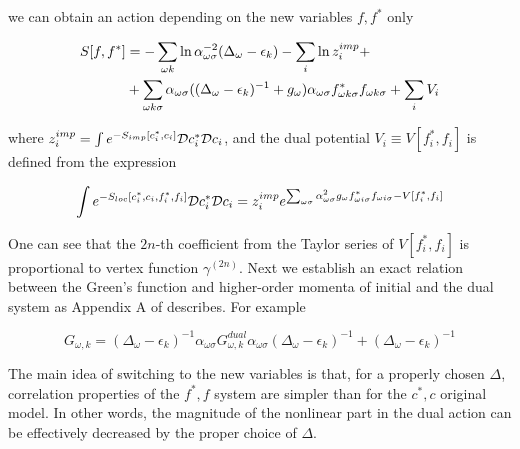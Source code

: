 we can obtain an action depending on the new variables $f,f^*$ only

\begin{equation}\begin{aligned}
S[f,f^*] & = -\sum_{\omega k} \ln{\alpha_{\omega\sigma}^{-2}(\Delta_\omega-\epsilon_k)} - \sum_i\ln{z_i^{imp}} + \\ 
	 & + \sum_{\omega k\sigma} \alpha_{\omega\sigma}((\Delta_\omega-\epsilon_k)^{-1}+g_\omega) \alpha_{\omega\sigma}f_{\omega k\sigma}^*f_{\omega k\sigma}+\sum_i V_i 
\end{aligned}\end{equation}

where $z_i^{imp} = \int e^{-S_{imp}[c_i^*,c_i]}\mathcal{D} c_i^*\mathcal{D} c_i$, and the dual potential $V_i \equiv V[f_i^*,f_i]$ is defined from the expression

\begin{equation} \int e^{-S_{loc}[c_i^*,c_i,f_i^*,f_i]}\mathcal{D} c_i^*\mathcal{D} c_i = 
  z_i^{imp}e^{\sum_{\omega\sigma}\alpha_{\omega\sigma}^2g_\omega f_{\omega i \sigma}^*f_{\omega i \sigma} - V[f_i^*,f_i]} \end{equation}

One can see that the $2n$-th coefficient from the Taylor series of $V[f_i^*,f_i]$ is proportional to vertex function $\gamma^{(2n)}$.
Next we establish an exact relation between the Green's function and higher-order momenta of initial and the dual system as Appendix A of \cite{0810.3819} describes.
For example 

\begin{equation}
 G_{\omega,k} = (\Delta_\omega-\epsilon_k)^{-1}\alpha_{\omega\sigma}G_{\omega,k}^{dual}\alpha_{\omega\sigma}(\Delta_\omega-\epsilon_k)^{-1} + (\Delta_\omega-\epsilon_k)^{-1}
\end{equation}

The main idea of switching to the new variables is that, for a properly chosen $\Delta$, correlation properties of the $f^*,f$ system are simpler than for the 
 $c^*,c$ original model. In other words, the magnitude of the nonlinear part in the dual action can be effectively decreased by the proper choice of $\Delta$.
